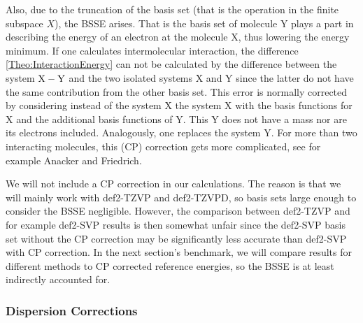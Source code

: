 Also, due to the truncation of the basis set (that is the operation in the finite subspace $X$),
the  BSSE arises. That is the basis set of molecule Y plays a
part in describing the energy of an electron at the molecule X, thus lowering the energy minimum.
If one calculates intermolecular interaction, the difference \eqref{Theo:InteractionEnergy} 
can not be calculated by the difference between the system ${{\text X - \text Y}}$ and the two isolated systems
X and Y since the latter do not have the same contribution from the other basis set.
This error is normally corrected by considering instead of the system X the system X
with the basis functions for X and the additional basis functions of Y. This
 Y does not have a mass nor are its electrons included.
Analogously, one replaces the system Y.
For more than two interacting molecules, this  (CP) correction
gets more complicated, see for example Anacker and Friedrich.
\cite{Anacker2014}

We will not include a CP correction in our calculations. The reason is that we will mainly
work with def2-TZVP and def2-TZVPD, so basis sets large enough to consider the 
BSSE negligible. However, the comparison between def2-TZVP and for example
def2-SVP results is then somewhat unfair since the def2-SVP basis set without the CP correction
may be significantly less accurate than def2-SVP with CP correction. In the next
section's benchmark, we will compare results for different methods to CP corrected reference 
energies, so the BSSE is at least indirectly accounted for.


\subsubsection{Dispersion Corrections}

